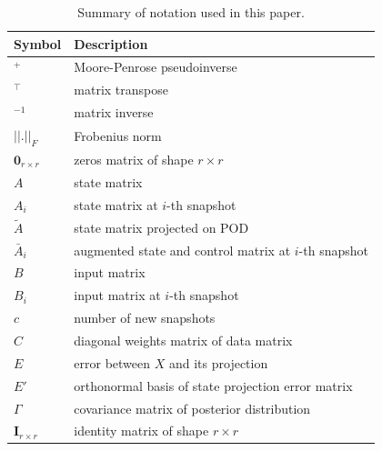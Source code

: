 \begin{table}[ht]
	\caption{Summary of notation used in this paper.}\label{tab:notation}
	\centering
	\begin{tabular}{p{2cm}l}
		\toprule
		\textbf{Symbol}                & \textbf{Description}                                    \\
		\midrule
	\(^+\)                         & Moore-Penrose pseudoinverse                             \\
	\(^\top \)                     & matrix transpose                                        \\
	\(^{-1}\)                      & matrix inverse                                          \\
	\(||.||_F\)                    & Frobenius norm                                          \\
	\(\mathbf{0}_{r \times r}\)    & zeros matrix of shape \(r \times r\)                    \\
	\(A\)                          & state matrix                                            \\
	\(A_i\)                        & state matrix at \(i\)-th snapshot                       \\
	\(\tilde{A}\)                  & state matrix projected on POD                           \\
	\(\bar{A}_i\)                  & augmented state and control matrix at \(i\)-th snapshot \\
	\(B\)                          & input matrix                                            \\
	\(B_i\)                        & input matrix at \(i\)-th snapshot                       \\
	\(c\)                          & number of new snapshots                                 \\
	\(C\)                          & diagonal weights matrix of data matrix                  \\
	\(E\)                          & error between \(X\) and its projection                  \\
	\(E'\)                         & orthonormal basis of state projection error matrix      \\
	\(\Gamma \)                    & covariance matrix of posterior distribution             \\
	\(\textbf{I}_{r \times r}\)    & identity matrix of shape \(r \times r\)                 \\

\end{tabular}
\end{table}
